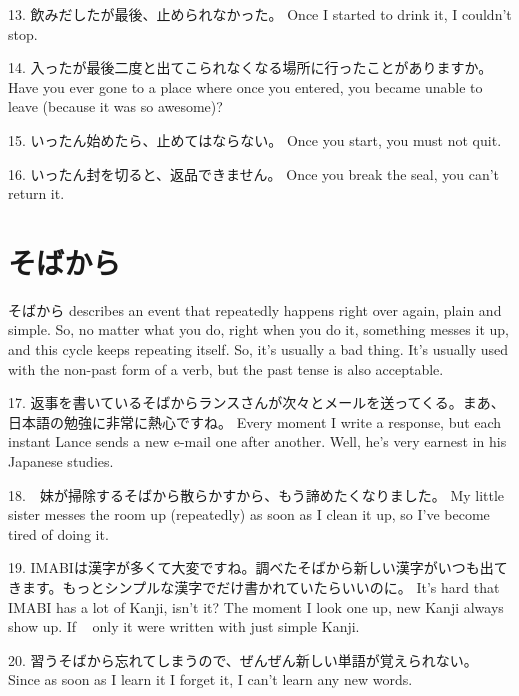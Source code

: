 \par{13. 飲みだしたが最後、止められなかった。 \hfill\break
Once I started to drink it, I couldn't stop. }

\par{14. 入ったが最後二度と出てこられなくなる場所に行ったことがありますか。 \hfill\break
Have you ever gone to a place where once you entered, you became unable to leave (because it was so awesome)? }

\par{15. いったん始めたら、止めてはならない。 \hfill\break
Once you start, you must not quit. }

\par{16. いったん封を切ると、返品できません。 \hfill\break
Once you break the seal, you can't return it. }
      
\section{そばから}
 
\par{ そばから describes an event that repeatedly happens right over again, plain and simple. So, no matter what you do, right when you do it, something messes it up, and this cycle keeps repeating itself. So, it's usually a bad thing. It's usually used with the non-past form of a verb, but the past tense is also acceptable. }

\par{17. 返事を書いているそばからランスさんが次々とメールを送ってくる。まあ、日本語の勉強に非常に熱心ですね。 \hfill\break
Every moment I write a response, but each instant Lance sends a new e-mail one after another. Well, he's very earnest in his Japanese studies. }

\par{18.　妹が掃除するそばから散らかすから、もう諦めたくなりました。 \hfill\break
My little sister messes the room up (repeatedly) as soon as I clean it up, so I've become tired of doing it. }

\par{19. IMABIは漢字が多くて大変ですね。調べたそばから新しい漢字がいつも出てきます。もっとシンプルな漢字でだけ書かれていたらいいのに。 \hfill\break
It's hard that IMABI has a lot of Kanji, isn't it? The moment I look one up, new Kanji always show up. If   only it were written with just simple Kanji. }

\par{20. 習うそばから忘れてしまうので、ぜんぜん新しい単語が覚えられない。 \hfill\break
Since as soon as I learn it I forget it, I can't learn any new words. }
    